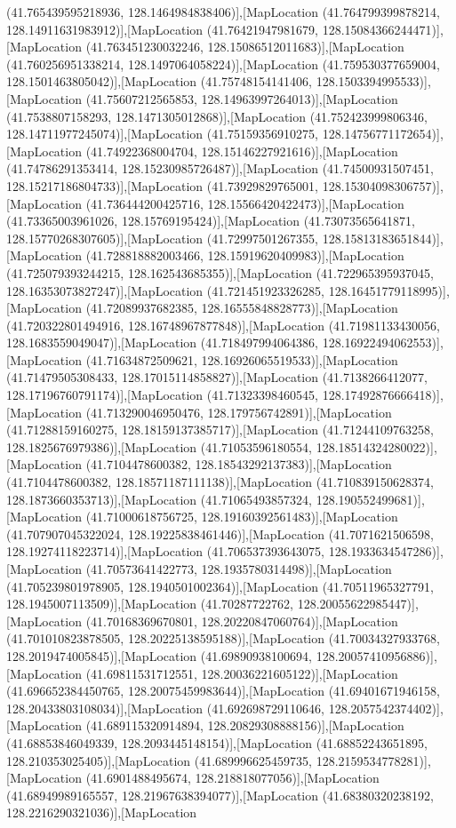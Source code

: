 (41.765439595218936, 128.1464984838406)],[MapLocation (41.764799399878214, 128.14911631983912)],[MapLocation (41.76421947981679, 128.15084366244471)],[MapLocation (41.763451230032246, 128.15086512011683)],[MapLocation (41.760256951338214, 128.1497064058224)],[MapLocation (41.759530377659004, 128.1501463805042)],[MapLocation (41.75748154141406, 128.1503394995533)],[MapLocation (41.75607212565853, 128.14963997264013)],[MapLocation (41.7538807158293, 128.1471305012868)],[MapLocation (41.752423999806346, 128.14711977245074)],[MapLocation (41.75159356910275, 128.14756771172654)],[MapLocation (41.74922368004704, 128.15146227921616)],[MapLocation (41.74786291353414, 128.15230985726487)],[MapLocation (41.74500931507451, 128.15217186804733)],[MapLocation (41.73929829765001, 128.15304098306757)],[MapLocation (41.736444200425716, 128.15566420422473)],[MapLocation (41.73365003961026, 128.15769195424)],[MapLocation (41.73073565641871, 128.15770268307605)],[MapLocation (41.72997501267355, 128.15813183651844)],[MapLocation (41.728818882003466, 128.15919620409983)],[MapLocation (41.725079393244215, 128.162543685355)],[MapLocation (41.722965395937045, 128.16353073827247)],[MapLocation (41.721451923326285, 128.16451779118995)],[MapLocation (41.72089937682385, 128.16555848828773)],[MapLocation (41.720322801494916, 128.16748967877848)],[MapLocation (41.71981133430056, 128.1683559049047)],[MapLocation (41.718497994064386, 128.16922494062553)],[MapLocation (41.71634872509621, 128.16926065519533)],[MapLocation (41.71479505308433, 128.17015114858827)],[MapLocation (41.7138266412077, 128.17196760791174)],[MapLocation (41.71323398460545, 128.17492876666418)],[MapLocation (41.713290046950476, 128.179756742891)],[MapLocation (41.71288159160275, 128.18159137385717)],[MapLocation (41.71244109763258, 128.1825676979386)],[MapLocation (41.71053596180554, 128.18514324280022)],[MapLocation (41.7104478600382, 128.18543292137383)],[MapLocation (41.7104478600382, 128.18571187111138)],[MapLocation (41.710839150628374, 128.1873660353713)],[MapLocation (41.71065493857324, 128.190552499681)],[MapLocation (41.71000618756725, 128.19160392561483)],[MapLocation (41.707907045322024, 128.19225838461446)],[MapLocation (41.7071621506598, 128.19274118223714)],[MapLocation (41.706537393643075, 128.1933634547286)],[MapLocation (41.70573641422773, 128.1935780314498)],[MapLocation (41.705239801978905, 128.1940501002364)],[MapLocation (41.70511965327791, 128.1945007113509)],[MapLocation (41.70287722762, 128.20055622985447)],[MapLocation (41.70168369670801, 128.20220847060764)],[MapLocation (41.701010823878505, 128.20225138595188)],[MapLocation (41.70034327933768, 128.2019474005845)],[MapLocation (41.69890938100694, 128.20057410956886)],[MapLocation (41.69811531712551, 128.20036221605122)],[MapLocation (41.696652384450765, 128.20075459983644)],[MapLocation (41.69401671946158, 128.20433803108034)],[MapLocation (41.692698729110646, 128.2057542374402)],[MapLocation (41.689115320914894, 128.20829308888156)],[MapLocation (41.68853846049339, 128.2093445148154)],[MapLocation (41.68852243651895, 128.210353025405)],[MapLocation (41.689996625459735, 128.2159534778281)],[MapLocation (41.6901488495674, 128.218818077056)],[MapLocation (41.68949989165557, 128.21967638394077)],[MapLocation (41.68380320238192, 128.2216290321036)],[MapLocation 